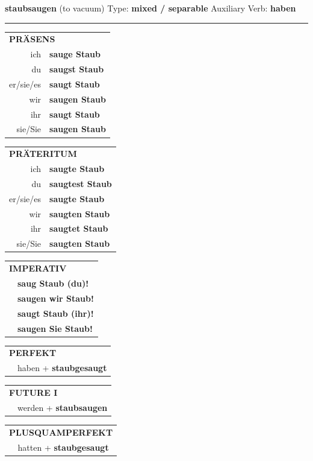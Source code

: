 \documentclass[10pt,a4paper]{revtex4-2}
\begin{document}
\begin{verbbox}
{\Large \bf staubsaugen} (to vacuum) \hfill Type: \textbf{mixed / separable} \hfill Auxiliary Verb: \textbf{haben} 

\vspace{5pt}
\hrule
\vspace{5pt}

\begin{tabular}{rl}
\multicolumn{2}{l}{\textbf{PRÄSENS}}\\
ich & \textbf{sauge Staub}\\
du & \textbf{saugst Staub}\\
er/sie/es & \textbf{saugt Staub}\\
wir & \textbf{saugen Staub}\\
ihr & \textbf{saugt Staub}\\
sie/Sie & \textbf{saugen Staub}\\
\end{tabular}
\hfill
\begin{tabular}{rl}
\multicolumn{2}{l}{\textbf{PRÄTERITUM}}\\
ich & \textbf{saugte Staub}\\
du & \textbf{saugtest Staub}\\
er/sie/es & \textbf{saugte Staub}\\
wir & \textbf{saugten Staub}\\
ihr & \textbf{saugtet Staub}\\
sie/Sie & \textbf{saugten Staub}\\
\end{tabular}
\hfill
\begin{tabular}{rl}
\multicolumn{2}{l}{\textbf{IMPERATIV}}\\
& \textbf{saug Staub (du)!}\\
& \textbf{saugen wir Staub!}\\
& \textbf{saugt Staub (ihr)!}\\
& \textbf{saugen Sie Staub!}\\
\end{tabular}

\vspace{10pt}

\begin{tabular}{rl}
\multicolumn{2}{l}{\textbf{PERFEKT}}\\
& haben + \textbf{staubgesaugt}\\
\end{tabular}
\hfill
\begin{tabular}{rl}
\multicolumn{2}{l}{\textbf{FUTURE I}}\\
& werden + \textbf{staubsaugen}\\
\end{tabular}
\hfill
\begin{tabular}{rl}
\multicolumn{2}{l}{\textbf{PLUSQUAMPERFEKT}}\\
& hatten + \textbf{staubgesaugt}\\
\end{tabular}


\end{verbbox}
\end{document}
